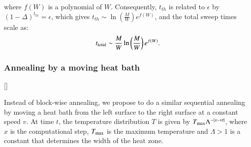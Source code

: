 \documentclass[twocolumn,superscriptaddress,english,showpacs,longbibliography]{revtex4-2}
\begin{document}
where $f(W)$ is a polynomial of $W$. Consequently, $t_{th}$ is related to $\epsilon$ by $\left( 1-\Delta \right) ^ {t_{th}} = \epsilon$, which gives $t_{th} \sim \ln\left(\frac{M}{W}\right)e^{f(W)}$, and the total sweep times scale as:
\begin{equation}\label{eq:totaltime}
t_{\rm total} \sim \frac{M}{W}\ln\left(\frac{M}{W}\right)e^{f(W)}.
\end{equation}




\subsubsection{Annealing by a moving heat bath}\label{estimation-of-the-computing-time}

[{\color{red}{**WARNING**: Because of the error in the previous section, the following part is also wrong}}]

Instead of block-wise annealing, we propose to do a similar sequential annealing by moving a heat bath from the left surface to the right surface at a constant speed $v$.
At time $t$, the temperature distribution $T$ is given by $T_{\rm max}\Lambda^{-|x - vt|}$, where $x$ is the computational step, $T_{\rm max}$ is the maximum temperature and $\Lambda > 1$ is a constant that determines the width of the heat zone.
\end{document}
